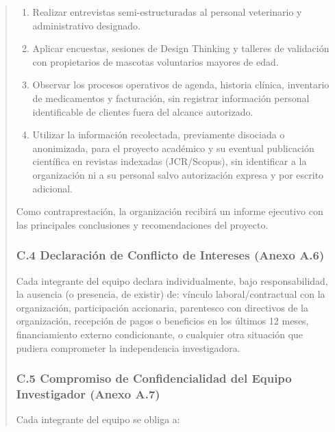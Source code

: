 \documentclass[
]{article}
\begin{document}
\begin{quote}
\begin{enumerate}
  \item Realizar entrevistas semi-estructuradas al personal veterinario y administrativo designado.
  \item Aplicar encuestas, sesiones de Design Thinking y talleres de validación con propietarios de mascotas voluntarios mayores de edad.
  \item Observar los procesos operativos de agenda, historia clínica, inventario de medicamentos y facturación, sin registrar información personal identificable de clientes fuera del alcance autorizado.
  \item Utilizar la información recolectada, previamente disociada o anonimizada, para el proyecto académico y su eventual publicación científica en revistas indexadas (JCR/Scopus), sin identificar a la organización ni a su personal salvo autorización expresa y por escrito adicional.
\end{enumerate}

Como contraprestación, la organización recibirá un informe ejecutivo con las principales conclusiones y recomendaciones del proyecto.

\subsubsection{C.4 Declaración de Conflicto de Intereses (Anexo A.6)}\label{c4-conflicto-intereses}

Cada integrante del equipo declara individualmente, bajo responsabilidad, la ausencia (o presencia, de existir) de: vínculo laboral/contractual con la organización, participación accionaria, parentesco con directivos de la organización, recepción de pagos o beneficios en los últimos 12 meses, financiamiento externo condicionante, o cualquier otra situación que pudiera comprometer la independencia investigadora.

\subsubsection{C.5 Compromiso de Confidencialidad del Equipo Investigador (Anexo A.7)}\label{c5-compromiso-confidencialidad}

Cada integrante del equipo se obliga a:


\end{quote}
\end{document}
